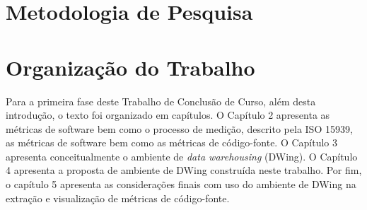 
\section {Metodologia de Pesquisa}

\section{Organização do Trabalho}

Para a primeira fase deste Trabalho de Conclusão de Curso, além desta 
introdução, o texto foi organizado em capítulos. O Capítulo 2 apresenta as 
métricas de software bem como o processo de medição, descrito pela ISO 15939, 
as métricas de software bem como as métricas de código-fonte. O Capítulo 3 
apresenta conceitualmente o ambiente de \textit{data warehousing} (DWing). O 
Capítulo 4 apresenta a proposta de ambiente de DWing construída neste 
trabalho. Por fim, o capítulo 5 apresenta as considerações finais com uso do 
ambiente de DWing na extração e visualização de métricas de código-fonte. 
